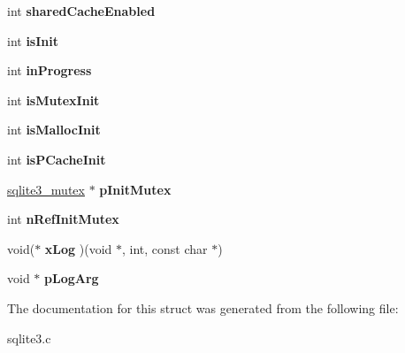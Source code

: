 \begin{DoxyCompactItemize}
\item 
\hypertarget{struct_sqlite3_config_ad9837f5e2f338d708234afdb8878184f}{int {\bfseries shared\-Cache\-Enabled}}\label{struct_sqlite3_config_ad9837f5e2f338d708234afdb8878184f}

\item 
\hypertarget{struct_sqlite3_config_a11f18afbc3476ee16d97e75ad770670e}{int {\bfseries is\-Init}}\label{struct_sqlite3_config_a11f18afbc3476ee16d97e75ad770670e}

\item 
\hypertarget{struct_sqlite3_config_a3cc1f0564475ead1840892e8ac6989ed}{int {\bfseries in\-Progress}}\label{struct_sqlite3_config_a3cc1f0564475ead1840892e8ac6989ed}

\item 
\hypertarget{struct_sqlite3_config_af576d567cc36956e0c4c3a7487b53edf}{int {\bfseries is\-Mutex\-Init}}\label{struct_sqlite3_config_af576d567cc36956e0c4c3a7487b53edf}

\item 
\hypertarget{struct_sqlite3_config_ab0ec050075ee245df0a54623b0073bfc}{int {\bfseries is\-Malloc\-Init}}\label{struct_sqlite3_config_ab0ec050075ee245df0a54623b0073bfc}

\item 
\hypertarget{struct_sqlite3_config_a945ec3af8fd8f2efaccec88e2597393b}{int {\bfseries is\-P\-Cache\-Init}}\label{struct_sqlite3_config_a945ec3af8fd8f2efaccec88e2597393b}

\item 
\hypertarget{struct_sqlite3_config_af8ffb8388972c384840dd36beca35e7e}{\hyperlink{structsqlite3__mutex}{sqlite3\-\_\-mutex} $\ast$ {\bfseries p\-Init\-Mutex}}\label{struct_sqlite3_config_af8ffb8388972c384840dd36beca35e7e}

\item 
\hypertarget{struct_sqlite3_config_a423f5c1b3f68d9c569661a542ebe7220}{int {\bfseries n\-Ref\-Init\-Mutex}}\label{struct_sqlite3_config_a423f5c1b3f68d9c569661a542ebe7220}

\item 
\hypertarget{struct_sqlite3_config_a59bd59da6676dc62f9acdd6ff6d27d82}{void($\ast$ {\bfseries x\-Log} )(void $\ast$, int, const char $\ast$)}\label{struct_sqlite3_config_a59bd59da6676dc62f9acdd6ff6d27d82}

\item 
\hypertarget{struct_sqlite3_config_a501ab4552bc7c54bb413aced5889dcdc}{void $\ast$ {\bfseries p\-Log\-Arg}}\label{struct_sqlite3_config_a501ab4552bc7c54bb413aced5889dcdc}

\end{DoxyCompactItemize}


The documentation for this struct was generated from the following file\-:\begin{DoxyCompactItemize}
\item 
sqlite3.\-c\end{DoxyCompactItemize}
